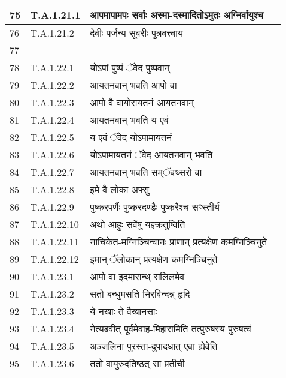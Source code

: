 \documentclass[17pt]{extarticle}
\begin{document}
\begin{longtable}{||p{0.4in}||p{0.9in}||p{4.0in}||p{0.9in}||}
        \hline
            75 & T.A.1.21.1 & आपमापामपः सर्वाः अस्मा{-}दस्मादितोऽमुतः अग्निर्वायुश्च &      \\
        \hline
            76 & T.A.1.21.2 & देवीः पर्जन्य सूवरीः पुत्रवत्त्वाय &      \\
        \hline
            77 &  &  &          \\
        \hline
            78 & T.A.1.22.1 & योऽपां पुष्पं ॅवेद पुष्पवान् &      \\
        \hline
            79 & T.A.1.22.2 & आयतनवान् भवति आपो वा &      \\
        \hline
            80 & T.A.1.22.3 & आपो वै वायोरायतनं आयतनवान् &      \\
        \hline
            81 & T.A.1.22.4 & आयतनवान् भवति य एवं &      \\
        \hline
            82 & T.A.1.22.5 & य एवं ॅवेद योऽपामायतनं &      \\
        \hline
            83 & T.A.1.22.6 & योऽपामायतनं ॅवेद आयतनवान् भवति &      \\
        \hline
            84 & T.A.1.22.7 & आयतनवान् भवति सम्ॅवथ्सरो वा &      \\
        \hline
            85 & T.A.1.22.8 & इमे वै लोका अफ्सु &      \\
        \hline
            86 & T.A.1.22.9 & पुष्करपर्णैः पुष्करदण्डैः पुष्करैश्च सꣳस्तीर्य &      \\
        \hline
            87 & T.A.1.22.10 & अथो आहुः सर्वेषु यज्ञ्क्रतुष्विति &      \\
        \hline
            88 & T.A.1.22.11 & नाचिकेत{-}मग्निञ्चिन्वानः प्राणान् प्रत्यक्षेण कमग्निञ्चिनुते &      \\
        \hline
            89 & T.A.1.22.12 & इमान् ॅलोकान् प्रत्यक्षेण कमग्निञ्चिनुते &      \\
        \hline
            90 & T.A.1.23.1 & आपो वा इदमासन्थ् सलिलमेव &      \\
        \hline
            91 & T.A.1.23.2 & सतो बन्धुमसति निरविन्दन्न् हृदि &      \\
        \hline
            92 & T.A.1.23.3 & ये नखाः ते वैखानसाः &      \\
        \hline
            93 & T.A.1.23.4 & नेत्यब्रवीत् पूर्वमेवाह{-}मिहासमिति तत्पुरुषस्य पुरुषत्वं &      \\
        \hline
            94 & T.A.1.23.5 & अञ्जलिना पुरस्ता{-}दुपादधात् एवा ह्येवेति &      \\
        \hline
            95 & T.A.1.23.6 & ततो वायुरुदतिष्ठत् सा प्रतीची &      \\

\end{longtable}
\end{document}
